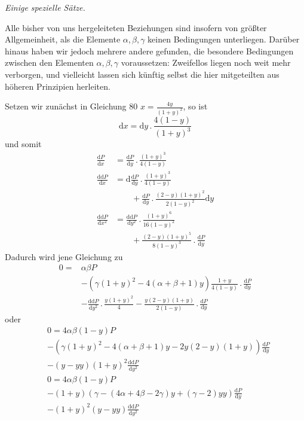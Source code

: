 \begin{center}\textit{Einige spezielle Sätze.}\end{center}
Alle bisher von uns hergeleiteten Beziehungen sind insofern von größter Allgemeinheit, als die Elemente $\alpha,\beta,\gamma$ keinen Bedingungen unterliegen. Darüber hinaus haben wir jedoch mehrere andere gefunden, die besondere Bedingungen zwischen den Elementen $\alpha,\beta,\gamma$ voraussetzen: Zweifellos liegen noch weit mehr verborgen, und vielleicht lassen sich künftig selbst die hier mitgeteilten aus höheren Prinzipien herleiten.
\par{}
Setzen wir zunächst in Gleichung 80 $x=\frac{4y}{(1+y)^2}$, so ist
\[
\mathrm dx=\mathrm dy\mathbin{.}\frac{4(1-y)}{(1+y)^3}
\]
und somit
\[
\begin{aligned}
\frac{\mathrm dP}{\mathrm dx}&=\frac{\mathrm dP}{\mathrm dy}\mathbin{.}\frac{(1+y)^3}{4(1-y)}\\
\frac{\mathrm{dd}P}{\mathrm dx}&=\mathrm d\frac{\mathrm dP}{\mathrm dy}\mathbin{.}\frac{(1+y)^3}{4(1-y)}\\&\qquad+\frac{\mathrm dP}{\mathrm dy}\mathbin{.}\frac{(2-y)(1+y)^2}{2(1-y)^2}\mathrm dy\\
\frac{\mathrm{dd}P}{\mathrm dx^2}&=\frac{\mathrm{dd}P}{\mathrm dy^2}\mathbin{.}\frac{(1+y)^6}{16(1-y)^2}\\&\qquad+\frac{(2-y)(1+y)^5}{8(1-y)^3}\mathbin{.}\frac{\mathrm dP}{\mathrm dy}
\end{aligned}
\]
Dadurch wird jene Gleichung zu
\[
\begin{aligned}
0={}&\alpha\beta P\\
&-(\gamma(1+y)^2-4(\alpha+\beta+1)y)\frac{1+y}{4(1-y)}\mathbin{.}\frac{\mathrm dP}{\mathrm dy}\\
&-\frac{\mathrm{dd}P}{\mathrm dy^2}\mathbin{.}\frac{y(1+y)^2}4
-\frac{y(2-y)(1+y)}{2(1-y)}\mathbin{.}\frac{\mathrm dP}{\mathrm dy}
\end{aligned}
\]
oder
\[
\begin{aligned}
&0=4\alpha\beta(1-y)P\\
&-(\gamma(1+y)^2-4(\alpha+\beta+1)y-2y(2-y)(1+y))\frac{\mathrm dP}{\mathrm dy}\\
&-(y-yy)(1+y)^2\frac{\mathrm{dd}P}{\mathrm dy^2}\\
&0=4\alpha\beta(1-y)P\\
&-(1+y)(\gamma-(4\alpha+4\beta-2\gamma)y+(\gamma-2)yy)\frac{\mathrm dP}{\mathrm dy}\\
&-(1+y)^2(y-yy)\frac{\mathrm{dd}P}{\mathrm dy^2}
\end{aligned}
\]
